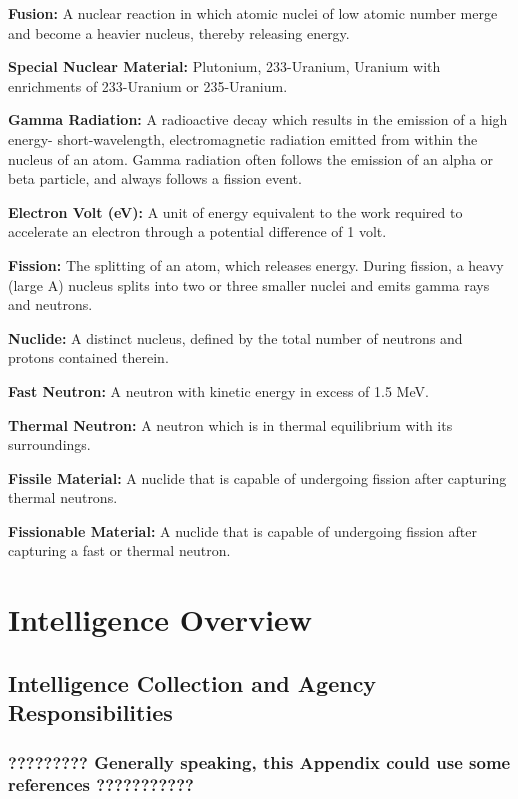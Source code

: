 \documentclass{report}
\begin{document}
\textbf{Fusion:} A nuclear reaction in which atomic nuclei of low atomic number merge and become a heavier nucleus, thereby releasing energy. 

\textbf{Special Nuclear Material:} Plutonium, 233-Uranium, Uranium with enrichments of 233-Uranium or 235-Uranium.

\textbf{Gamma Radiation:} A radioactive decay which results in the emission of a high energy- short-wavelength, electromagnetic radiation emitted from within the nucleus of an atom. Gamma radiation often follows the emission of an alpha or beta particle, and always follows a fission event. 

\textbf{Electron Volt (eV):} A unit of energy equivalent to the work required to accelerate an electron through a potential difference of 1 volt. 

\textbf{Fission:} The splitting of an atom, which releases energy. During fission, a heavy (large A) nucleus splits into two or three smaller nuclei and emits gamma rays and neutrons. 

\textbf{Nuclide:} A distinct nucleus, defined by the total number of neutrons and protons contained therein.  

\textbf{Fast Neutron:} A neutron with kinetic energy in excess of 1.5 MeV.

\textbf{Thermal Neutron:} A neutron which is in thermal equilibrium with its surroundings. 

\textbf{Fissile Material:} A nuclide that is capable of undergoing fission after capturing thermal neutrons.

\textbf{Fissionable Material:} A nuclide that is capable of undergoing fission after capturing a fast or thermal neutron.




\chapter[Appendix B: Intelligence Overview]{Intelligence Overview}  \label{app:intel}


\section{Intelligence Collection and Agency Responsibilities}

\subsection{?????????  Generally speaking, this Appendix could use some references ???????????}
\end{document}
